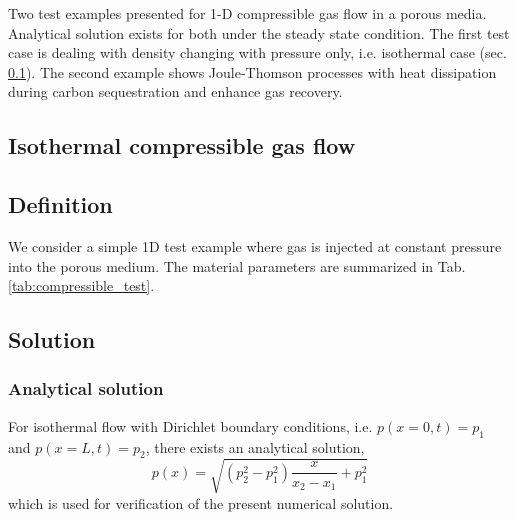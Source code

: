 Two test examples presented for 1-D compressible gas flow in a porous media. Analytical solution exists for both under the steady state condition. The first test case is dealing with density changing with pressure only, i.e. isothermal case (sec. \ref{bmt:Isothermal_compressible_flow}). The second example shows Joule-Thomson processes with heat dissipation during carbon sequestration and enhance gas recovery.
\subsection{Isothermal compressible gas flow}
\label{bmt:Isothermal_compressible_flow}
\subsection{Definition}
We consider a simple 1D test example where gas is injected at constant pressure into the porous medium. The material
parameters are summarized in Tab. \ref{tab:compressible_test}.
\subsection{Solution}
\subsubsection{Analytical solution}
For isothermal flow with Dirichlet boundary conditions, i.e. $p(x=0, t)=p_1$ and $p(x=L, t)=p_2$, there exists an analytical solution,
\begin{equation}
p(x)=\sqrt{(p_2^2-p_1^2)\frac{x}{x_2-x_1}+p_1^2}
\label{eqn:press_analytical}
\end{equation}
which is used for verification of the present numerical solution.


